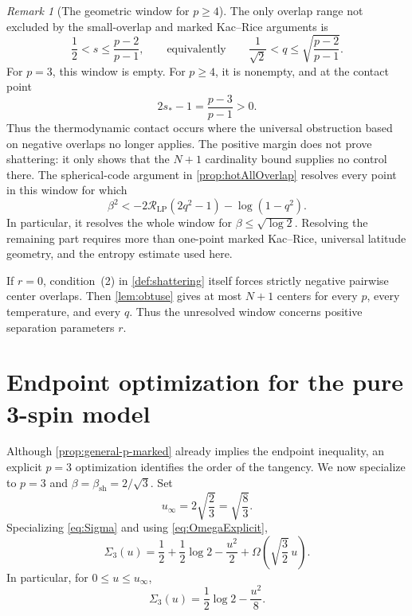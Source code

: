 \documentclass[11pt,reqno]{amsart}
\numberwithin{equation}{section}
\theoremstyle{plain}
\theoremstyle{definition}
\theoremstyle{remark}
\newtheorem{remark}[remark]{Remark}
\newcommand{\1}{\mathbf 1}
\newcommand{\bsh}{\beta_{\mathrm{sh}}}
\newcommand{\Om}{\Omega}
\begin{document}
\begin{remark}[The geometric window for \(p\geq4\)]
\label{rem:general-p-window}
The only overlap range not excluded by the small-overlap and marked
Kac--Rice arguments is
\begin{equation}\label{eq:generalWindow}
 \frac12<s\leq\frac{p-2}{p-1},
 \qquad\text{equivalently}\qquad
 \frac1{\sqrt2}<q\leq\sqrt{\frac{p-2}{p-1}}.
\end{equation}
For \(p=3\), this window is empty.  For \(p\geq4\), it is nonempty,
and at the contact point
\begin{equation}\label{eq:contactGeometryMargin}
 2s_*-1=\frac{p-3}{p-1}>0.
\end{equation}
Thus the thermodynamic contact occurs where the universal obstruction
based on negative overlaps no longer applies.  The positive margin
does not prove shattering: it only shows that the \(N+1\) cardinality
bound supplies no control there.  The spherical-code argument in
\cref{prop:hotAllOverlap} resolves every point in this window for which
\begin{equation}\label{eq:windowCodeCriterion}
 \beta^2<
 -2\mathcal R_{\mathrm{LP}}(2q^2-1)-\log(1-q^2).
\end{equation}
In particular, it resolves the whole window for
\(\beta\leq\sqrt{\log2}\).  Resolving the remaining part requires more
than one-point marked Kac--Rice, universal latitude geometry, and the
entropy estimate used here.

If \(r=0\), condition~\textup{(2)} in \cref{def:shattering} itself
forces strictly negative pairwise center overlaps.  Then
\cref{lem:obtuse} gives at most \(N+1\) centers for every \(p\), every
temperature, and every \(q\).  Thus the unresolved window concerns
positive separation parameters \(r\).
\end{remark}

\section{Endpoint optimization for the pure 3-spin model}\label{sec:optimization}

Although \cref{prop:general-p-marked} already implies the endpoint
inequality, an explicit \(p=3\) optimization identifies the order of
the tangency.  We now specialize to \(p=3\) and
\(\beta=\bsh=2/\sqrt3\).  Set
\begin{equation}\label{eq:uinfty}
 u_\infty=2\sqrt{\frac{2}{3}}=\sqrt{\frac83}.
\end{equation}
Specializing \eqref{eq:Sigma} and using \eqref{eq:OmegaExplicit},
\begin{equation}\label{eq:Sigma3}
 \Sigma_3(u)
 =\frac12+\frac12\log2-\frac{u^2}{2}
  +\Om\left(\sqrt{\frac32}\,u\right).
\end{equation}
In particular, for \(0\leq u\leq u_\infty\),
\begin{equation}\label{eq:SigmaInside}
 \Sigma_3(u)=\frac12\log2-\frac{u^2}{8}.
\end{equation}
\end{document}

